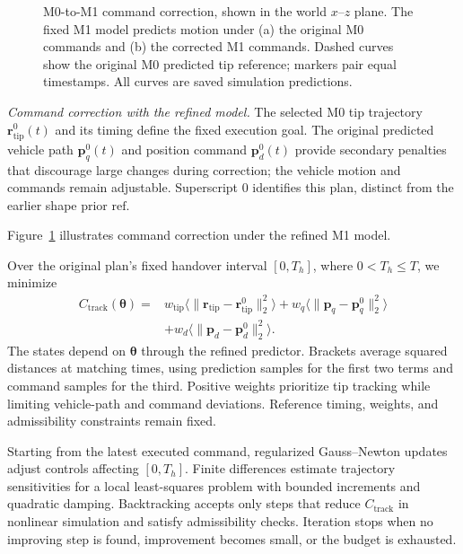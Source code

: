 \documentclass[letterpaper, 10 pt, conference]{ieeeconf}
\begin{document}
\begin{figure}[t]
    \centering
    \resizebox{\columnwidth}{!}{}
    \caption{M0-to-M1 command correction, shown in the world $x$--$z$
    plane. The fixed M1 model predicts motion under (a) the original
    M0 commands and (b) the corrected M1 commands. Dashed curves show
    the original M0 predicted tip reference; markers pair equal
    timestamps. All curves are saved simulation predictions.}
    \label{fig:command_correction}
\end{figure}

\noindent\emph{Command correction with the refined model.}
The selected M0 tip trajectory $\mathbf r_{\mathrm{tip}}^0(t)$ and
its timing define the fixed execution goal. The original predicted
vehicle path $\mathbf p_q^0(t)$ and position command
$\mathbf p_d^0(t)$ provide secondary penalties that discourage large
changes during correction; the vehicle motion and commands remain
adjustable. Superscript $0$ identifies this plan, distinct from the
earlier shape prior $\mathrm{ref}$.

Figure~\ref{fig:command_correction} illustrates command correction
under the refined M1 model.

Over the original plan's fixed handover interval $[0,T_h]$,
where $0<T_h\leq T$, we minimize
\begin{equation}
\begin{aligned}
C_{\mathrm{track}}(\boldsymbol\theta)
={}&w_{\mathrm{tip}}\bigl\langle\|\mathbf r_{\mathrm{tip}}-\mathbf r_{\mathrm{tip}}^0\|_2^2\bigr\rangle
+w_q\bigl\langle\|\mathbf p_q-\mathbf p_q^0\|_2^2\bigr\rangle\\
&+w_d\bigl\langle\|\mathbf p_d-\mathbf p_d^0\|_2^2\bigr\rangle.
\end{aligned}
\label{eq:reference_tracking_cost}
\end{equation}
The states depend on $\boldsymbol\theta$ through the refined
predictor. Brackets average squared distances at matching times,
using prediction samples for the first two terms and command
samples for the third. Positive weights prioritize tip tracking
while limiting vehicle-path and command deviations. Reference
timing, weights, and admissibility constraints remain fixed.

Starting from the latest executed command, regularized
Gauss--Newton updates adjust controls affecting $[0,T_h]$.
Finite differences estimate trajectory sensitivities for a local
least-squares problem with bounded increments and quadratic
damping. Backtracking accepts only steps that reduce
$C_{\mathrm{track}}$ in nonlinear simulation and satisfy
admissibility checks. Iteration stops when no improving step
is found, improvement becomes small, or the budget is exhausted.
\end{document}
